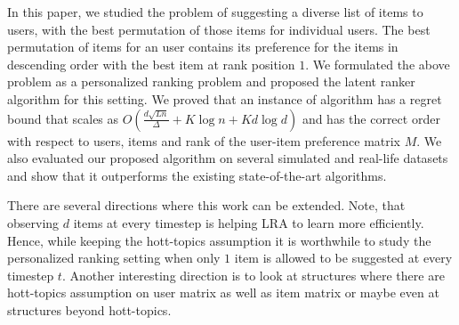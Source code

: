 In this paper, we studied the problem of suggesting a diverse list of items to users, with the best permutation of those items for individual users. The best permutation of items for an user contains its preference for the items in descending order with the best item at rank position $1$. We formulated the above problem as a personalized ranking problem and proposed the latent ranker algorithm for this setting. We proved that an instance of algorithm has  a regret bound that scales as $O\left(\frac{d \sqrt{L n}}{\Delta} + K \log n + K d \log d\right)$ and has the correct order with respect to users, items and rank of the user-item preference matrix $M$. We also evaluated our proposed algorithm on several simulated and real-life datasets and show that it outperforms the existing state-of-the-art algorithms.

There are several directions where this work can be extended. Note, that observing $d$ items at every timestep is helping LRA to learn more efficiently. Hence,  while keeping the hott-topics assumption it is worthwhile to study the personalized ranking setting when only $1$ item is allowed to be suggested at every timestep $t$. Another interesting direction is to look at structures where there are hott-topics assumption on user matrix as well as item matrix or maybe even at structures beyond hott-topics.


